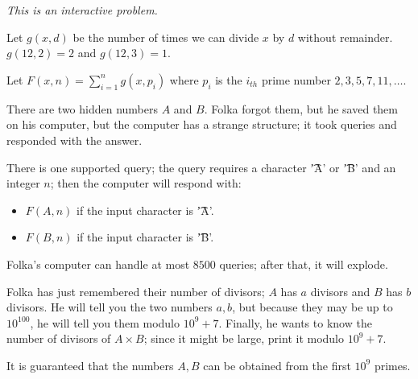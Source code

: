 \it{This is an interactive problem.}

Let $g(x, d)$ be the number of times we can divide $x$ by $d$ without remainder. $g(12, 2) = 2$ and $g(12, 3) = 1$.

Let $F(x, n) = \sum_{i = 1}^n g(x, p_i)$ where $p_i$ is the $i_{th}$ prime number $2, 3, 5, 7, 11, \dots$.

There are two hidden numbers $A$ and $B$. Folka forgot them, but he saved them on his computer, but the computer has a strange structure; it took queries and responded with the answer.

There is one supported query; the query requires a character \t{'A'} or \t{'B'} and an integer $n$; then the computer will respond with:

\begin{itemize}
  \item $F(A, n)$ if the input character is \t{'A'}.
  \item $F(B, n)$ if the input character is \t{'B'}.
\end{itemize}

Folka's computer can handle at most $8500$ queries; after that, it will explode.

Folka has just remembered their number of divisors; $A$ has $a$ divisors and $B$ has $b$ divisors. He will tell you the two numbers $a, b$, but because they may be up to $10^{100}$, he will tell you them modulo $10^9 + 7$. Finally, he wants to know the number of divisors of $A \times B$; since it might be large, print it modulo $10^9 + 7$.

It is guaranteed that the numbers $A,B$ can be obtained from the first $10^{9}$ primes.